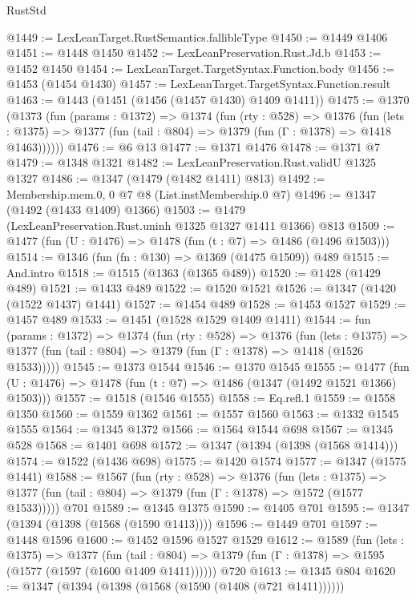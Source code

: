 \begin{lexlean}{RustStd}
\begin{coremodule}
@1449 := LexLeanTarget.RustSemantics.fallibleType
@1450 := @1449 @1406
@1451 := @1448 @1450
@1452 := LexLeanPreservation.Rust.Jd.b
@1453 := @1452 @1450
@1454 := LexLeanTarget.TargetSyntax.Function.body
@1456 := @1453 (@1454 @1430)
@1457 := LexLeanTarget.TargetSyntax.Function.result
@1463 := @1443 (@1451 (@1456 (@1457 @1430) @1409 @1411))
@1475 := @1370
    (@1373
      (fun (params : @1372) =>
      @1374
        (fun (rty : @528) =>
        @1376
          (fun (lets : @1375) =>
          @1377 (fun (tail : @804) => @1379 (fun (Γ : @1378) => @1418 @1463))))))
@1476 := @6 @13
@1477 := @1371 @1476
@1478 := @1371 @7
@1479 := @1348 @1321
@1482 := LexLeanPreservation.Rust.validU @1325 @1327
@1486 := @1347 (@1479 (@1482 @1411) @813)
@1492 := Membership.mem.{0, 0} @7 @8 (List.instMembership.{0} @7)
@1496 := @1347 (@1492 (@1433 @1409) @1366)
@1503 := @1479 (LexLeanPreservation.Rust.uninh @1325 @1327 @1411 @1366) @813
@1509 := @1477 (fun (U : @1476) => @1478 (fun (t : @7) => @1486 (@1496 @1503)))
@1514 := @1346 (fun (fn : @130) => @1369 (@1475 @1509)) @489
@1515 := And.intro
@1518 := @1515 (@1363 (@1365 @489))
@1520 := @1428 (@1429 @489)
@1521 := @1433 @489
@1522 := @1520 @1521
@1526 := @1347 (@1420 (@1522 @1437) @1441)
@1527 := @1454 @489
@1528 := @1453 @1527
@1529 := @1457 @489
@1533 := @1451 (@1528 @1529 @1409 @1411)
@1544 := fun (params : @1372) =>
  @1374
    (fun (rty : @528) =>
    @1376
      (fun (lets : @1375) =>
      @1377 (fun (tail : @804) => @1379 (fun (Γ : @1378) => @1418 (@1526 @1533)))))
@1545 := @1373 @1544
@1546 := @1370 @1545
@1555 := @1477 (fun (U : @1476) => @1478 (fun (t : @7) => @1486 (@1347 (@1492 @1521 @1366) @1503)))
@1557 := @1518 (@1546 @1555)
@1558 := Eq.refl.{1}
@1559 := @1558 @1350
@1560 := @1559 @1362
@1561 := @1557 @1560
@1563 := @1332 @1545 @1555
@1564 := @1345 @1372
@1566 := @1564 @1544 @698
@1567 := @1345 @528
@1568 := @1401 @698
@1572 := @1347 (@1394 (@1398 (@1568 @1414)))
@1574 := @1522 (@1436 @698)
@1575 := @1420 @1574
@1577 := @1347 (@1575 @1441)
@1588 := @1567
    (fun (rty : @528) =>
    @1376
      (fun (lets : @1375) =>
      @1377 (fun (tail : @804) => @1379 (fun (Γ : @1378) => @1572 (@1577 @1533)))))
    @701
@1589 := @1345 @1375
@1590 := @1405 @701
@1595 := @1347 (@1394 (@1398 (@1568 (@1590 @1413))))
@1596 := @1449 @701
@1597 := @1448 @1596
@1600 := @1452 @1596 @1527 @1529
@1612 := @1589
    (fun (lets : @1375) =>
    @1377
      (fun (tail : @804) => @1379 (fun (Γ : @1378) => @1595 (@1577 (@1597 (@1600 @1409 @1411))))))
    @720
@1613 := @1345 @804
@1620 := @1347 (@1394 (@1398 (@1568 (@1590 (@1408 (@721 @1411))))))

\end{coremodule}
\end{lexlean}

